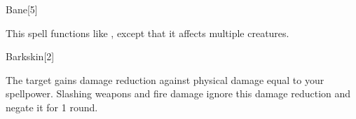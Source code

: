 \begin{spellsection}[Mass]{Bane}[5]
    \begin{spellheader}
    \end{spellheader}
    \begin{spellcontent}
        \begin{spelltargetinginfo}
        \end{spelltargetinginfo}
        \begin{spelleffects}
            \spellspecial This spell functions like , except that it affects multiple creatures.
        \end{spelleffects}
    \end{spellcontent}
    \begin{spellfooter}
        \miscastexplode
    \end{spellfooter}
\end{spellsection}

\begin{spellsection}{Barkskin}[2]
    \begin{spellheader}
    \end{spellheader}
    \begin{spellcontent}
        \begin{spelltargetinginfo}
        \end{spelltargetinginfo}
        \begin{spelleffects}
            \spelleffect The target gains damage reduction against physical damage equal to your spellpower. Slashing weapons and fire damage ignore this damage reduction and negate it for 1 round.
            \spelldur \durpersonallong
        \end{spelleffects}
    \end{spellcontent}
    \begin{spellfooter}
        \miscastexplode
    \end{spellfooter}
\end{spellsection}

